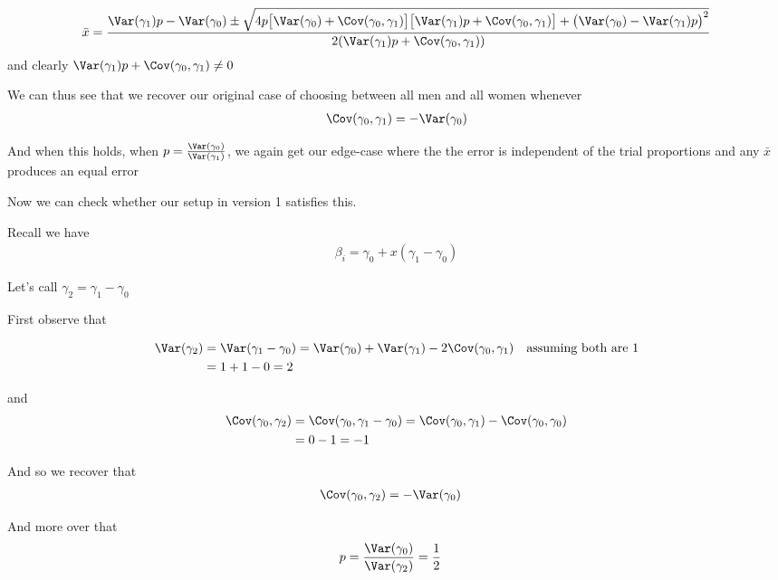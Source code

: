 \begin{align*}
	\bar{x} = \frac{\Var(\gamma_1) p - \Var(\gamma_0) \pm \sqrt{ 4 p \big[ \Var(\gamma_0) + \Cov(\gamma_0, \gamma_1) \big] \big[ \Var(\gamma_1) p + \Cov(\gamma_0, \gamma_1) \big] + \big(\Var(\gamma_0) - \Var(\gamma_1) p\big)^2 } }{ 2 (\Var(\gamma_1) p + \Cov(\gamma_0, \gamma_1)) } 
\end{align*} 
and clearly $\Var(\gamma_1) p + \Cov(\gamma_0, \gamma_1) \neq 0$


We can thus see that we recover our original case of choosing between all men and all women whenever
\begin{align*}
	\Cov(\gamma_0, \gamma_1) = - \Var(\gamma_0)
\end{align*} 

And when this holds, when $p = \frac{\Var(\gamma_0)}{\Var(\gamma_1)}$, we again get our edge-case where the the error is independent of the trial proportions and any $\bar{x}$ produces an equal error

Now we can check whether our setup in version 1 satisfies this.

Recall we have
\begin{align*}
	\beta_i = \gamma_0 + x ( \gamma_1 - \gamma_0)
\end{align*} 

Let's call $\gamma_2 = \gamma_1 - \gamma_0$

First observe that 

\begin{align*}
	\Var(\gamma_2) &= \Var(\gamma_1 - \gamma_0) = \Var(\gamma_0) + \Var(\gamma_1)  - 2 \Cov(\gamma_0, \gamma_1) \quad \text{assuming both are 1} \\
				   &= 1 + 1 - 0 = 2
\end{align*} 

and 
\begin{align*}
	\Cov(\gamma_0, \gamma_2)	&= \Cov(\gamma_0, \gamma_1 - \gamma_0) = \Cov(\gamma_0, \gamma_1) - \Cov(\gamma_0, \gamma_0) \\
										&= 0 - 1 = -1
\end{align*} 

And so we recover that
\begin{align*}
	\Cov(\gamma_0, \gamma_2) &= -\Var(\gamma_{0})
\end{align*} 

And more over that
\begin{align*}
	p = \frac{\Var(\gamma_0)}{\Var(\gamma_2)} &= \frac{1}{2}
\end{align*} 

